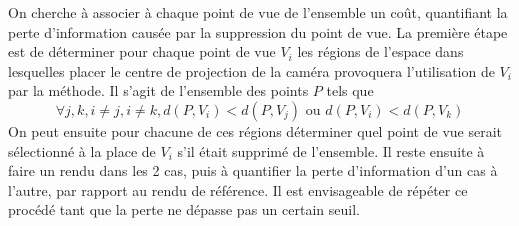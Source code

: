 On cherche à associer à chaque point de vue de l'ensemble un coût, quantifiant la perte d'information causée par la suppression du point de vue.
La première étape est de déterminer pour chaque point de vue $V_i$ les régions de l'espace dans lesquelles placer le centre de projection de la caméra
provoquera l'utilisation de $V_i$ par la méthode. Il s'agit de l'ensemble des points $P$ tels que \[\forall{}j,k,i\neq{}j,i\neq{}k, d(P,V_i) < d(P,V_j) \text{ ou } d(P,V_i) < d(P,V_k)\]
On peut ensuite pour chacune de ces régions déterminer quel point de vue serait sélectionné à la place de $V_i$ s'il était supprimé de l'ensemble.
Il reste ensuite à faire un rendu dans les 2 cas, puis à quantifier la perte d'information d'un cas à l'autre, par rapport au rendu de référence.
Il est envisageable de répéter ce procédé tant que la perte ne dépasse pas un certain seuil.
